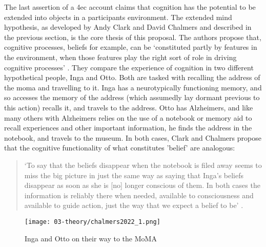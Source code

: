 The last assertion of a \gls{4ec} account claims that cognition has the potential to be extended into objects in a participants environment. The extended mind hypothesis, as developed by Andy Clark and David Chalmers and described in the previous section, is the core thesis of this proposal. The authors propose that, cognitive processes, beliefs for example, can be `constituted partly by features in the environment, when those features play the right sort of role in driving cognitive processes' \citeyearpar[p. 12]{clark1998}. They compare the experience of cognition in two different hypothetical people, Inga and Otto. Both are tasked with recalling the address of the \gls{moma} and travelling to it. Inga has a neurotypically functioning memory, and so accesses the memory of the address (which assumedly lay dormant previous to this action) recalls it, and travels to the address. Otto has Alzheimers, and like many others with Alzheimers relies on the use of a notebook or memory aid to recall experiences and other important information, he finds the address in the notebook, and travels to the museum. In both cases, Clark and Chalmers propose that the cognitive functionality of what constitutes 'belief' are analogous:
\begin{quote}
    `To say that the beliefs disappear when the notebook is filed away seems to miss the big picture in just the same way as saying that Inga's beliefs disappear as soon as she is [no] longer conscious of them. In both cases the information is reliably there when needed, available to consciousness and available to guide action, just the way that we expect a belief to be' \citeyearpar[13]{clark1998}.
\end{quote}

\begin{figure}[ht]
    \centering
    \texttt{[image: 03-theory/chalmers2022\_1.png]}
    \captionsetup{justification=centering,margin=1.5cm}
    \caption{Inga and Otto on their way to the MoMA \citep[by Tim Peacock in][]{chalmers2022}}\label{fig: chalmers2022_1}
\end{figure}


